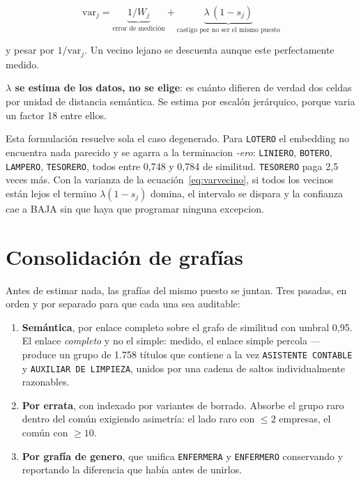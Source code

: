 \documentclass[12pt,a4paper]{report}
\newcommand{\cargo}[1]{\texttt{#1}}
\begin{document}
\begin{equation}
\mathrm{var}_j = \underbrace{1/W_j}_{\text{error de medición}} +
                 \underbrace{\lambda\,(1 - s_j)}_{\text{castigo por no ser el mismo puesto}}
\label{eq:varvecino}
\end{equation}

y pesar por $1/\mathrm{var}_j$. Un vecino lejano se descuenta aunque este
perfectamente medido.

\textbf{$\lambda$ se estima de los datos, no se elige}: es cuánto difieren de
verdad dos celdas por unidad de distancia semántica. Se estima por escalón
jerárquico, porque varia un factor 18 entre ellos.

Esta formulación resuelve sola el caso degenerado. Para \cargo{LOTERO} el
embedding no encuentra nada parecido y se agarra a la terminacion \emph{-ero}:
\cargo{LINIERO}, \cargo{BOTERO}, \cargo{LAMPERO}, \cargo{TESORERO}, todos entre
0,748 y 0,784 de similitud. \cargo{TESORERO} paga 2,5 veces más. Con la varianza
de la ecuación~\eqref{eq:varvecino}, si todos los vecinos están lejos el termino
$\lambda(1-s_j)$ domina, el intervalo se dispara y la confianza cae a BAJA sin
que haya que programar ninguna excepcion.

\section{Consolidación de grafías}

Antes de estimar nada, las grafías del mismo puesto se juntan. Tres pasadas, en
orden y por separado para que cada una sea auditable:

\begin{enumerate}[nosep]
  \item \textbf{Semántica}, por enlace completo sobre el grafo de similitud con
        umbral 0,95. El enlace \emph{completo} y no el simple: medido, el enlace
        simple percola --- produce un grupo de 1.758 títulos que contiene a la vez
        \cargo{ASISTENTE CONTABLE} y \cargo{AUXILIAR DE LIMPIEZA}, unidos por una
        cadena de saltos individualmente razonables.
  \item \textbf{Por errata}, con indexado por variantes de borrado. Absorbe el
        grupo raro dentro del común exigiendo asimetría: el lado raro con
        $\le 2$ empresas, el común con $\ge 10$.
  \item \textbf{Por grafía de genero}, que unifica \cargo{ENFERMERA} y
        \cargo{ENFERMERO} conservando y reportando la diferencia que había antes
        de unirlos.
\end{enumerate}
\end{document}

